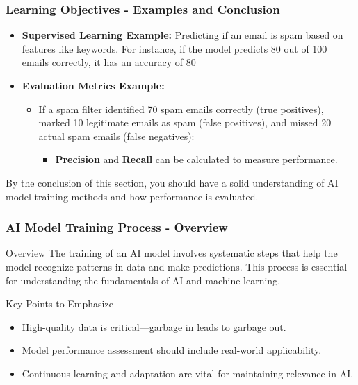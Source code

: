 \documentclass[aspectratio=169]{beamer}
\begin{document}
\begin{frame}[fragile]
    \frametitle{Learning Objectives - Examples and Conclusion}
    \begin{itemize}
        \item \textbf{Supervised Learning Example:} Predicting if an email is spam based on features like keywords. For instance, if the model predicts 80 out of 100 emails correctly, it has an accuracy of 80%
        \item \textbf{Evaluation Metrics Example:} 
        \begin{itemize}
            \item If a spam filter identified 70 spam emails correctly (true positives), marked 10 legitimate emails as spam (false positives), and missed 20 actual spam emails (false negatives):
            \begin{itemize}
                \item \textbf{Precision} and \textbf{Recall} can be calculated to measure performance.
            \end{itemize}
        \end{itemize}
    \end{itemize}
    By the conclusion of this section, you should have a solid understanding of AI model training methods and how performance is evaluated.
\end{frame}

\begin{frame}[fragile]
    \frametitle{AI Model Training Process - Overview}
    \begin{block}{Overview}
        The training of an AI model involves systematic steps that help the model recognize patterns in data and make predictions. This process is essential for understanding the fundamentals of AI and machine learning.
    \end{block}

    \begin{block}{Key Points to Emphasize}
        \begin{itemize}
            \item High-quality data is critical—garbage in leads to garbage out.
            \item Model performance assessment should include real-world applicability.
            \item Continuous learning and adaptation are vital for maintaining relevance in AI.
        \end{itemize}
    \end{block}
\end{frame}
\end{document}
